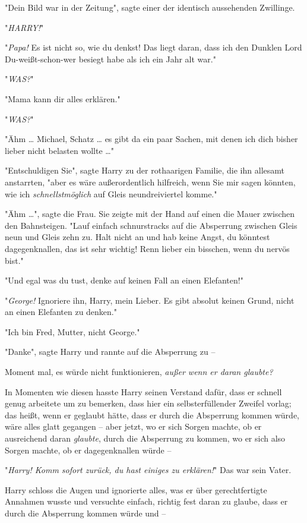{"Dein Bild war in der Zeitung", sagte einer der identisch aussehenden Zwillinge.

"\emph{HARRY!}"

"\emph{Papa!} Es ist nicht so, wie du denkst! Das liegt daran, dass ich den Dunklen Lord Du-weißt-schon-wer besiegt habe als ich ein Jahr alt war."

"\emph{WAS?}"

"Mama kann dir alles erklären."

"\emph{WAS?}"

"Ähm … Michael, Schatz … es gibt da ein paar Sachen, mit denen ich dich bisher lieber nicht belasten wollte …"

"Entschuldigen Sie", sagte Harry zu der rothaarigen Familie, die ihn allesamt anstarrten, "aber es wäre außerordentlich hilfreich, wenn Sie mir sagen könnten, wie ich \emph{schnellstmöglich} auf Gleis neundreiviertel komme."

"Ähm …", sagte die Frau. Sie zeigte mit der Hand auf einen die Mauer zwischen den Bahnsteigen. "Lauf einfach schnurstracks auf die Absperrung zwischen Gleis neun und Gleis zehn zu. Halt nicht an und hab keine Angst, du könntest dagegenknallen, das ist sehr wichtig! Renn lieber ein bisschen, wenn du nervös bist."

"Und egal was du tust, denke auf keinen Fall an einen Elefanten!"

"\emph{George!} Ignoriere ihn, Harry, mein Lieber. Es gibt absolut keinen Grund, nicht an einen Elefanten zu denken."

"Ich bin Fred, Mutter, nicht George."

"Danke", sagte Harry und rannte auf die Absperrung zu --

Moment mal, es würde nicht funktionieren, \emph{außer wenn er daran glaubte?}

In Momenten wie diesen hasste Harry seinen Verstand dafür, dass er schnell genug arbeitete um zu bemerken, dass hier ein selbsterfüllender Zweifel vorlag; das heißt, wenn er geglaubt hätte, dass er durch die Absperrung kommen würde, wäre alles glatt gegangen -- aber jetzt, wo er sich Sorgen machte, ob er ausreichend daran \emph{glaubte}, durch die Absperrung zu kommen, wo er sich also Sorgen machte, ob er dagegenknallen würde --

"\emph{Harry! Komm sofort zurück, du hast einiges zu erklären!}" Das war sein Vater.

Harry schloss die Augen und ignorierte alles, was er über gerechtfertigte Annahmen wusste und versuchte einfach, richtig fest daran zu glaube, dass er durch die Absperrung kommen würde und --

}
